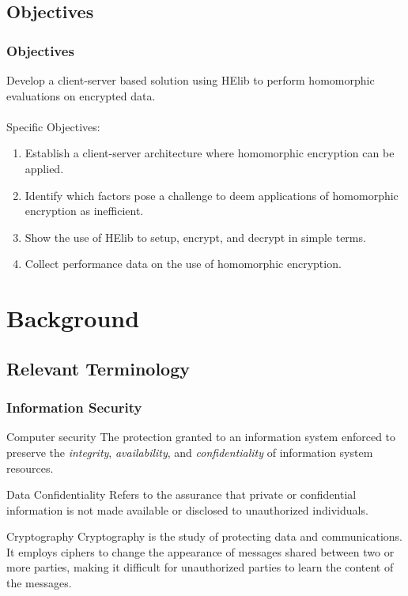\documentclass{beamer}
\begin{document}
\subsection{Objectives}
\begin{frame}
\frametitle{Objectives}

Develop a client-server based solution using HElib to perform homomorphic evaluations on encrypted data. \\~\\

Specific Objectives:\\
\begin{enumerate}
\item Establish a client-server architecture where homomorphic encryption can be applied.
\item Identify which factors pose a challenge to deem applications of homomorphic encryption as inefficient.
\item Show the use of HElib to setup, encrypt, and decrypt in simple terms.
\item Collect performance data on the use of homomorphic encryption.
\end{enumerate}


\end{frame}

\section{Background}
\subsection{Relevant Terminology}
\begin{frame}
\frametitle{Information Security}

\begin{block}{Computer security \cite{NIST95}}
The protection granted to an information system enforced to preserve the \emph{integrity}, \emph{availability}, and \emph{confidentiality} of information system resources.
\end{block}

\begin{block}{Data Confidentiality \cite{CryptoStallings}}
Refers to the assurance that private or confidential information is not made available or disclosed to unauthorized individuals.
\end{block}

\begin{block}{Cryptography \cite{IntroCryptoMath}}
Cryptography is the study of protecting data and communications. It employs ciphers to change the appearance of messages shared between two or more parties, making it difficult for unauthorized parties to learn the content of the messages.
\end{block}

\end{frame}
\end{document}
